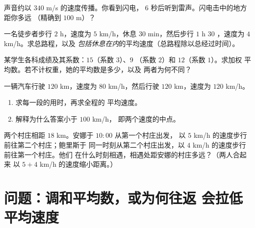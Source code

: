 \begin{exercise}[$\star$]\label{exo:g8:speed:7}
声音约以 $340$ m/s 的速度传播。你看到闪电，
$6$ 秒后听到雷声。闪电击中的地方距你多远
（精确到 $100$ m）？
\end{exercise}

\begin{exercise}[$\star\star$]\label{exo:g8:speed:8}
一名徒步者步行 $2$ h，速度为 $5$ km/h，休息 $30$ min，然后步行 $1$ h $30$
，速度为 $4$ km/h。求总路程，以及
\emph{包括休息在内}的平均速度（总路程除以总经过时间）。
\end{exercise}

\begin{exercise}[$\star\star$]\label{exo:g8:speed:9}
某学生各科成绩及其系数：$15$（系数 $3$）、$9$
（系数 $2$）和 $12$（系数 $1$）。求加权
平均数。若不计权重，她的平均数是多少，以及
两者为何不同？
\end{exercise}

\begin{exercise}[$\star\star$]\label{exo:g8:speed:10}
一辆汽车行驶 $120$ km，速度为 $80$ km/h，然后行驶 $120$ km，速度为 $120$ km/h。
\begin{enumerate}
  \item 求每一段的用时，再求全程的
        平均速度。
  \item 解释为什么答案小于 $100$ km/h，
        即两个速度的中点。
\end{enumerate}
\end{exercise}

\begin{exercise}[$\star\star\star$]\label{exo:g8:speed:11}
两个村庄相距 $18$ km。安娜于 $10{:}00$ 从第一个村庄出发，
以 $5$ km/h 的速度步行前往第二个村庄；鲍里斯于
同一时刻从第二个村庄出发，以 $4$ km/h 的速度步行前往第一个村庄。他们
在什么时刻相遇，相遇处距安娜的村庄多远？（两人合起来
以 $5 + 4$ km/h 的速度缩小距离。）
\end{exercise}

\section{问题：调和平均数，或为何往返
会拉低平均速度}

